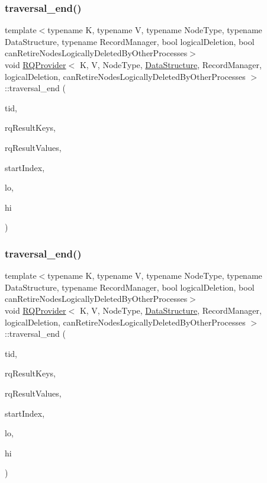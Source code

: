 \subsubsection{\texorpdfstring{traversal\+\_\+end()}{traversal\_end()}\hspace{0.1cm}{\footnotesize\ttfamily [4/5]}}
{\footnotesize\ttfamily template$<$typename K, typename V, typename Node\+Type, typename Data\+Structure, typename Record\+Manager, bool logical\+Deletion, bool can\+Retire\+Nodes\+Logically\+Deleted\+By\+Other\+Processes$>$ \\
void \hyperlink{classRQProvider}{R\+Q\+Provider}$<$ K, V, Node\+Type, \hyperlink{classDataStructure}{Data\+Structure}, Record\+Manager, logical\+Deletion, can\+Retire\+Nodes\+Logically\+Deleted\+By\+Other\+Processes $>$\+::traversal\+\_\+end (\begin{DoxyParamCaption}\item[{const int}]{tid,  }\item[{K $\ast$const}]{rq\+Result\+Keys,  }\item[{V $\ast$const}]{rq\+Result\+Values,  }\item[{int $\ast$const}]{start\+Index,  }\item[{const K \&}]{lo,  }\item[{const K \&}]{hi }\end{DoxyParamCaption})\hspace{0.3cm}{\ttfamily [inline]}}

\mbox{\label{classRQProvider_ad4bbd6a7d5ea8f497a49ba3bbd03f7fc}} 
\subsubsection{\texorpdfstring{traversal\+\_\+end()}{traversal\_end()}\hspace{0.1cm}{\footnotesize\ttfamily [5/5]}}
{\footnotesize\ttfamily template$<$typename K, typename V, typename Node\+Type, typename Data\+Structure, typename Record\+Manager, bool logical\+Deletion, bool can\+Retire\+Nodes\+Logically\+Deleted\+By\+Other\+Processes$>$ \\
void \hyperlink{classRQProvider}{R\+Q\+Provider}$<$ K, V, Node\+Type, \hyperlink{classDataStructure}{Data\+Structure}, Record\+Manager, logical\+Deletion, can\+Retire\+Nodes\+Logically\+Deleted\+By\+Other\+Processes $>$\+::traversal\+\_\+end (\begin{DoxyParamCaption}\item[{const int}]{tid,  }\item[{K $\ast$const}]{rq\+Result\+Keys,  }\item[{V $\ast$const}]{rq\+Result\+Values,  }\item[{int $\ast$const}]{start\+Index,  }\item[{const K \&}]{lo,  }\item[{const K \&}]{hi }\end{DoxyParamCaption})\hspace{0.3cm}{\ttfamily [inline]}}

